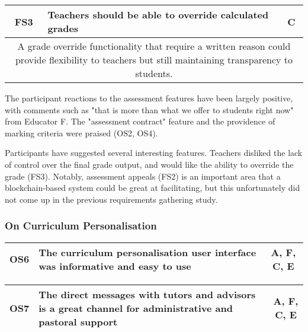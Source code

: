 \begin{table}[!ht]
	\begin{tabularx}{\textwidth}{|c|X|c|}
		\hline
		FS3 & \textbf{Teachers should be able to override calculated grades} & C \\
		\hline
		\multicolumn{3}{|X|}{
			A grade override functionality that require a written reason could provide
			flexibility to teachers but still maintaining transparency to students.
		}                                                                        \\
		\hline
	\end{tabularx}
\end{table}

The participant reactions to the assessment features have been largely positive, 
with comments such as "that is more than what we offer to students right now" from 
Educator F.
The "assessment contract" feature and the providence of marking criteria were praised (OS2, OS4).

Participants have suggested several interesting features.
Teachers disliked the lack of control over the final grade output, and would like 
the ability to override the grade (FS3).
Notably, assessment appeals (FS2) is an important area that a blockchain-based system 
could be great at facilitating, but this unfortunately did not come up in the previous 
requirements gathering study.

\subsubsection{On Curriculum Personalisation}

\begin{table}[!ht]
	\begin{tabularx}{\textwidth}{|c|X|c|}
		\hline
		OS6 & \textbf{The curriculum personalisation user interface was informative and easy to use} & A, F, C, E \\
		\hline
	\end{tabularx}
\end{table}

\begin{table}[!ht]
	\begin{tabularx}{\textwidth}{|c|X|c|}
		\hline
		OS7 & \textbf{The direct messages with tutors and advisors is a great channel for administrative and pastoral support} & A, F, C, E \\
		\hline
	\end{tabularx}
\end{table}

